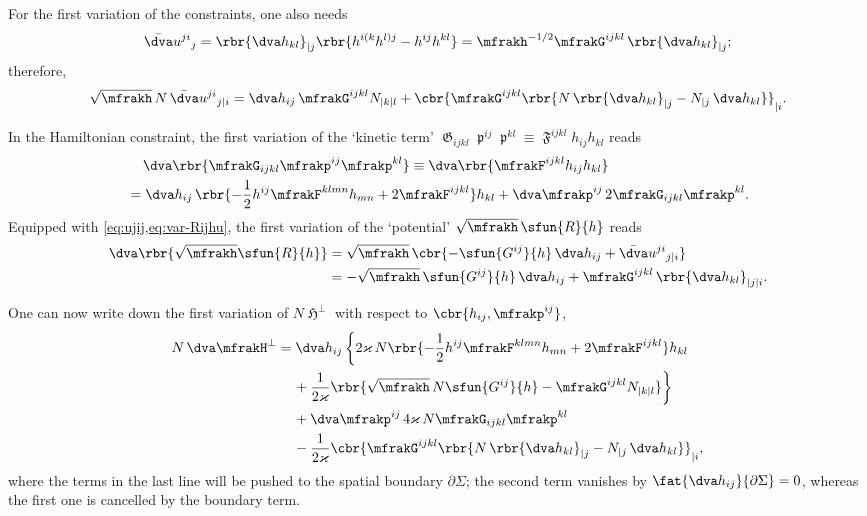\documentclass[a4paper,11pt]{article}
\begin{document}
For the first variation of the constraints, one also needs
\begin{align}
\bar{\dva}u^{ji}{}_{j} = \rbr{\dva h_{kl}}_{|j}
\rbr{h^{i(k}h^{l)j}-h^{ij}h^{kl}}
= \mfrakh^{-1/2}\mfrakG^{ijkl}\,\rbr{\dva h_{kl}}_{|j};
\label{eq:ujij}
\end{align}
therefore, 
\begin{align}
\sqrt{\mfrakh}\,N \,\bar{\dva}u^{ji}{}_{j|i} =
\dva h_{ij}\,\mfrakG^{ijkl}N_{|k|l}
+\cbr{\mfrakG^{ijkl}
\rbr{N\,\rbr{\dva h_{kl}}_{|j} - N_{|j}\,\dva h_{kl}} }_{|i}.
\end{align}

In the Hamiltonian constraint, the first variation of the `kinetic term'
$\mfrakG_{ijkl}\mfrakp^{ij}\mfrakp^{kl} \equiv
\mfrakF^{ijkl}h_{ij}h_{kl}$ reads
\begin{align}
&\quad\,\dva\rbr{ \mfrakG_{ijkl} \mfrakp^{ij}\mfrakp^{kl}}
\equiv \dva\rbr{\mfrakF^{ijkl}h_{ij}h_{kl}}
\nonumber \\
&=\dva h_{ij}\,\rbr{-\frac{1}{2} h^{ij} \mfrakF^{klmn} h_{mn}
+ 2 \mfrakF^{ijkl} } h_{kl} 
+\dva \mfrakp^{ij}\,2 \mfrakG_{ijkl}\mfrakp^{kl}.
\end{align}
Equipped with \cref{eq:ujij,eq:var-Rijhu}, the first variation of the 
`potential' 
$\sqrt{\mfrakh} \,\sfun{R}{h}$ reads
\begin{align}
\dva\rbr{\sqrt{\mfrakh}\sfun{R}{h}} &= \sqrt{\mfrakh}\,
\cbr{-\sfun{G^{ij}}{h}\,\dva h_{ij} +
\bar{\dva}u^{ji}{}_{j|i}}
\nonumber \\
&= -\sqrt{\mfrakh}\,\sfun{G^{ij}}{h}\,\dva h_{ij} +
\mfrakG^{ijkl}\,\rbr{\dva h_{kl}}_{|j|i}.
\end{align}

One can now write down the first variation of $N\mfrakH^\perp$ with respect to 
$\cbr{h_{ij}, \mfrakp^{ij}}$,
\begin{align}
N\,\dva \mfrakH^\perp &= \dva h_{ij}\,\bigg\{
2\varkappa\,N\rbr{ -\frac{1}{2}h^{ij} \mfrakF^{klmn} h_{mn}
+ 2 \mfrakF^{ijkl}} h_{kl}
\nonumber \\
&\quad\,
+\frac{1}{2\varkappa}
\rbr{ \sqrt{\mfrakh}\,N\sfun{G^{ij}}{h}
-\mfrakG^{ijkl}N_{|k|l}}\bigg\}
\nonumber \\
&\quad\,
+\dva \mfrakp^{ij}\,4\varkappa\,N\mfrakG_{ijkl}\mfrakp^{kl}
\nonumber \\
&\quad\,
-\frac{1}{2\varkappa}
\cbr{\mfrakG^{ijkl}
\rbr{N\,\rbr{\dva h_{kl}}_{|j} - N_{|j}\,\dva h_{kl}} }_{|i},
\end{align}
where the terms in the last line will be pushed to the spatial boundary
$\partial\Sigma$; the second term
vanishes by $\fat{\dva h_{ij}}{\partial\Sigma} = 0$, whereas the first one is
cancelled by the boundary term.
\end{document}
